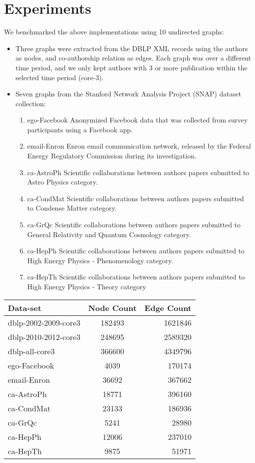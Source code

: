 \section{Experiments}
We benchmarked the above implementations using 10 undirected graphs:
\begin{itemize}
	\item 
		Three graphs were extracted from the DBLP XML records using the authors 
		as nodes, and co-authorship relation as edges. Each graph was over a 
		different time period, and  we only kept authors with 3 or more 
		publication within the selected time period (core-3). 
	\item 
		Seven graphs from the Stanford Network Analysis Project (SNAP) dataset
		collection:
		\begin{enumerate}
			\item {ego-Facebook} 
				Anonymized Facebook data that was collected from survey 
				participants using a Facebook app.
			\item {email-Enron} 
				Enron email communication network, released by the 
				Federal Energy Regulatory Commission during its investigation.
			\item {ca-AstroPh}
				Scientific collaborations between authors papers submitted to 
				Astro Physics category.
			\item {ca-CondMat}
				Scientific collaborations between authors papers submitted to 
				Condense Matter category.
			\item {ca-GrQc}
				Scientific collaborations between authors papers submitted to 
				General Relativity and Quantum Cosmology category.
			\item {ca-HepPh}
				Scientific collaborations between authors papers submitted to 
				High Energy Physics - Phenomenology category.
			\item {ca-HepTh}
				Scientific collaborations between authors papers submitted to 
				High Energy Physics - Theory category
		\end{enumerate}
\end{itemize}

\begin{tabular}{ |l||c|r| }
	\hline
	Data-set & Node Count & Edge Count \\
	\hline
	dblp-2002-2009-core3 & 182493 & 1621846 \\
	dblp-2010-2012-core3 & 248695 & 2589320 \\
	dblp-all-core3       & 366600 & 4349796 \\
	ego-Facebook         & 4039   & 170174  \\
	email-Enron          & 36692  & 367662  \\
	ca-AstroPh           & 18771  & 396160  \\
	ca-CondMat           & 23133  & 186936  \\
	ca-GrQc              & 5241   & 28980   \\
	ca-HepPh             & 12006  & 237010  \\
	ca-HepTh             & 9875   & 51971   \\
	\hline  
\end{tabular}

